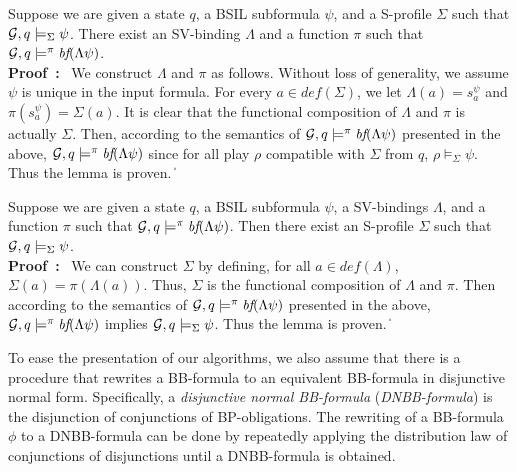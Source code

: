 \documentclass[11pt]{article}
\newcommand{\embf}{\textit{bf}}
\newcommand{\emdef}{\textit{def}}
\newcommand{\calg}{{\cal G}}
\newcommand{\pf}{\noindent\mbox{\bf Proof : }}
\def\qed{\ifmmode\|\else{\unskip\nobreak\hfil
\penalty50\hskip1em\null\nobreak\hfil$\blacksquare$
\parfillskip=0pt\finalhyphendemerits=0\endgraf}\fi}
\begin{document}
{\lemma \label{lemma.bbf.fwd}
Suppose we are given a state $q$, 
a BSIL subformula $\psi$, and 
a S-profile $\Sigma$ such that $\calg,q\models_\Sigma\psi$.  
There exist an SV-binding $\Lambda$ and a function $\pi$ such that 
$\calg,q\models^\pi\embf(\Lambda\psi)$.  
} 
\\\pf 
We construct $\Lambda$ and $\pi$ as follows. 
Without loss of generality, 
we assume $\psi$ is unique in the input formula. 
For every $a\in\emdef(\Sigma)$, 
we let $\Lambda(a)=s_a^\psi$ and $\pi(s_a^\psi)=\Sigma(a)$.  
It is clear that the functional composition of $\Lambda$ and $\pi$ is actually $\Sigma$.   
Then, according to the semantics of 
$\calg,q\models^\pi\embf(\Lambda\psi)$ presented in the above, 
$\calg,q\models^\pi\embf(\Lambda\psi)$ since 
for all play $\rho$ compatible with $\Sigma$ from $q$, 
$\rho\models_\Sigma\psi$.  
Thus the lemma is proven. 
\qed 

{\lemma \label{lemma.bbf.bkd}
Suppose we are given a state $q$,
a BSIL subformula $\psi$, 
a SV-bindings $\Lambda$, 
and a function $\pi$ such that  
$\calg,q\models^\pi\embf(\Lambda\psi)$.  
Then there exist an S-profile $\Sigma$ 
such that $\calg,q\models_\Sigma\psi$. 
}
\\\pf 
We can construct $\Sigma$ by 
defining, for all $a\in \emdef(\Lambda)$, 
$\Sigma(a)=\pi(\Lambda(a))$.  
Thus, $\Sigma$ is the functional composition of $\Lambda$ and $\pi$.  
Then according to the semantics of  
$\calg,q\models^\pi\embf(\Lambda\psi)$ presented in the above, 
$\calg,q\models^\pi\embf(\Lambda\psi)$ implies $\calg,q\models_\Sigma \psi$.  
Thus the lemma is proven.  
\qed 



To ease the presentation of our algorithms,
we also assume that there is a procedure that 
rewrites a BB-formula to an equivalent BB-formula in disjunctive normal 
form.  
Specifically, a {\em disjunctive normal BB-formula} 
({\em DNBB-formula}) is the disjunction of conjunctions of 
BP-obligations. 
The rewriting of a BB-formula $\phi$ to a DNBB-formula can be 
done by repeatedly applying the distribution law of conjunctions 
of disjunctions until 
a DNBB-formula is obtained.
\end{document}
